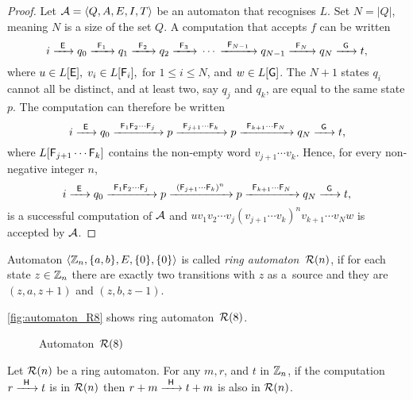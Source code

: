 \begin{proof}
    Let ${\mathcal{A}} = \langle Q, A, E, I, T \rangle$ be an automaton that recognises $L$. Set $N = |Q|$, meaning $N$ is a size of the set $Q$. A computation that accepts $f$ can be written
    \[
        i {\; \xrightarrow[]{\: \; {\mathsf{E}} \: \;} \;} q_0 {\; \xrightarrow[]{\: \; {\mathsf{F}}_1 \: \;} \;} q_1 {\; \xrightarrow[]{\: \; {\mathsf{F}}_2 \: \;} \;} q_2 {\; \xrightarrow[]{\: \; {\mathsf{F}}_3 \: \;} \;} \dotsm {\; \xrightarrow[]{\: \; {\mathsf{F}}_{N-1} \: \;} \;} q_{N-1} {\; \xrightarrow[]{\: \; {\mathsf{F}}_{N} \: \;} \;} q_N {\; \xrightarrow[]{\: \; {\mathsf{G}} \: \;} \;} t,
    \]
    where $u \in L[{\mathsf{E}}], \; v_i \in L[{\mathsf{F}}_i], $ for $ 1 \leq i \leq N$, and $w \in L[{\mathsf{G}}]$. The $N + 1$ states $q_i$ cannot all be distinct, and at least two, say $q_j$ and $q_k$, are equal to the same state $p$. The computation can therefore be written
    \[
        i {\; \xrightarrow[]{\: \; {\mathsf{E}} \: \;} \;} q_0 {\; \xrightarrow[]{\: \; {\mathsf{F}}_1 {\mathsf{F}}_2 \dotsm {\mathsf{F}}_j \: \;} \;} p {\; \xrightarrow[]{\: \; {\mathsf{F}}_{j+1} \dotsm {\mathsf{F}}_k \: \;} \;} p {\; \xrightarrow[]{\: \; {\mathsf{F}}_{k+1} \dotsm {\mathsf{F}}_N \: \;} \;} q_N {\; \xrightarrow[]{\: \; {\mathsf{G}} \: \;} \;} t,
    \]
    where $L[{\mathsf{F}}_{j+1} \dotsm {\mathsf{F}}_k]$ contains the non-empty word $v_{j+1} \dotsm v_k$. Hence, for every non-negative integer $n$,
    \[
        i {\; \xrightarrow[]{\: \; {\mathsf{E}} \: \;} \;} q_0 {\; \xrightarrow[]{\: \; {\mathsf{F}}_1 {\mathsf{F}}_2 \dotsm {\mathsf{F}}_j \: \;} \;} p {\; \xrightarrow[]{\: \; {({\mathsf{F}}_{j+1} \dotsm {\mathsf{F}}_k)}^n \: \;} \;} p {\; \xrightarrow[]{\: \; {\mathsf{F}}_{k+1} \dotsm {\mathsf{F}}_N \: \;} \;} q_N {\; \xrightarrow[]{\: \; {\mathsf{G}} \: \;} \;} t,
    \]
    is a successful computation of ${\mathcal{A}}$ and $u v_1 v_2 \dotsm v_j {(v_{j+1} \dotsm v_k)}^n v_{k+1} \dotsm v_N w$ is accepted by ${\mathcal{A}}$.
\end{proof}

\begin{defn}
    Automaton $\langle \mathbb{Z}_n, \{a,b\}, E, \{0\}, \{0\} \rangle$ is called \emph{ring automaton~${{\mathcal{R}}(n)}$}, if for each state $z \in \mathbb{Z}_n$ there are exactly two transitions with $z$ as a~source and they are $(z, a, z+1)$ and $(z, b, z-1)$.
\end{defn}

\begin{example}
    \autoref*{fig:automaton_R8} shows ring automaton~${{\mathcal{R}}(8)}$.

    \begin{figure}[h]
        \centering
        
        \caption{Automaton~${{\mathcal{R}}(8)}$}\label{fig:automaton_R8}
    \end{figure}
\end{example}

\begin{lemma}\label{lm:R_n_computation_existence}
    Let ${\mathcal{R}}(n)$ be a ring automaton. For any $m, r$, and $t$ in $\mathbb{Z}_n$, if the computation $r {\; \xrightarrow[]{\: \; {\mathsf{H}} \: \;} \;} t$ is in ${\mathcal{R}}(n)$ then $r+m {\; \xrightarrow[]{\: \; {\mathsf{H}} \: \;} \;} t+m$ is also in ${\mathcal{R}}(n)$.
\end{lemma}


